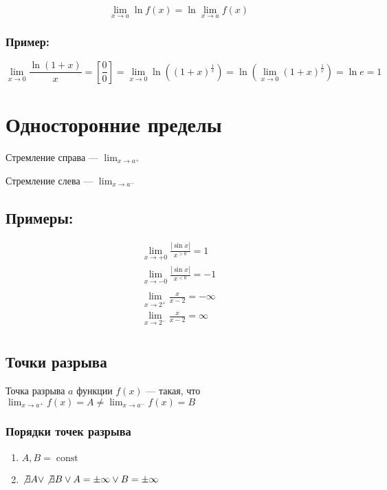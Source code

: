 \documentclass{article}
\DeclareMathOperator*{\Const}{const}
\begin{document}
\[
\lim_{x \to a} \ln{f(x)} = \ln{\lim_{x \to a} f(x)}
\]

\subsubsection*{Пример:}

\[
\lim_{x \to 0} \frac{\ln(1 + x)}{x} = \left[ \frac{0}{0} \right] =
\lim_{x \to 0} \ln \left((1 + x)^{\frac{1}{x}}\right) = 
\ln \left(\lim_{x \to 0} (1 + x)^\frac{1}{x}\right) = \ln e = 1
\]

\section{Односторонние пределы}

Стремление справа --- $\lim_{x \to a^{+}}$

Стремление слева --- $\lim_{x \to a^{-}}$

\subsection*{Примеры:}

\begin{gather*}
	\lim_{x \to +0} \frac{|\sin x|}{x^{>0}} = 1 \\
	\lim_{x \to -0} \frac{|\sin x|}{x^{<0}} = -1 \\
\end{gather*}
\begin{gather*}
	\lim_{x \to 2^{+}} \frac{x}{x-2} = -\infty \\
	\lim_{x \to 2^{-}} \frac{x}{x-2} = \infty \\
\end{gather*}

\subsection{Точки разрыва}

Точка разрыва $a$ функции $f(x)$ --- такая, что $\lim_{x \to a^+} f(x) = A \ne \lim_{x \to a^-} f(x) = B$

\subsubsection{Порядки точек разрыва}

\begin{enumerate}
	\item $A, B = \Const$
	\item $\not \exists A \lor \not \exists B \lor A = \pm \infty \lor B = \pm \infty$
\end{enumerate}
\end{document}
